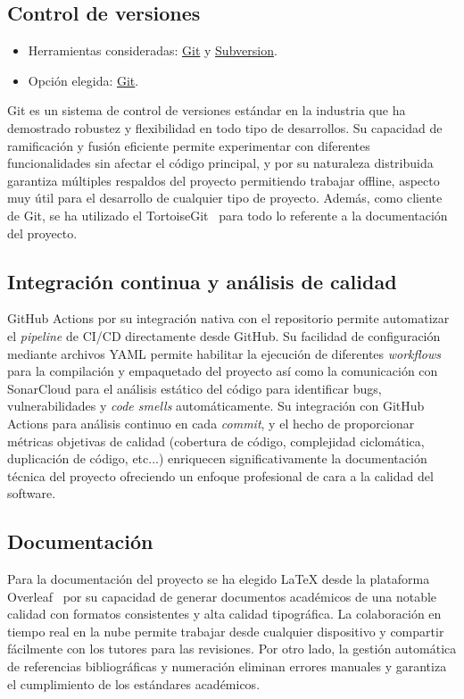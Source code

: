 \subsection{Control de versiones}\label{control-de-versiones}

\begin{itemize}
\tightlist
\item
  Herramientas consideradas: \href{https://git-scm.com/}{Git} y
  \href{https://subversion.apache.org/}{Subversion}.
\item
  Opción elegida: \href{https://git-scm.com/}{Git}.
\end{itemize}

Git es un sistema de control de versiones estándar en la industria que ha demostrado robustez y flexibilidad en todo tipo de desarrollos. Su capacidad de ramificación y fusión eficiente permite experimentar con diferentes funcionalidades sin afectar el código principal, y por su naturaleza distribuida garantiza múltiples respaldos del proyecto permitiendo trabajar offline, aspecto muy útil para el desarrollo de cualquier tipo de proyecto.
Además, como cliente de Git, se ha utilizado el TortoiseGit~\cite{tortoisegit} para todo lo referente a la documentación del proyecto.

\subsection{Integración continua y análisis de calidad}\label{integracion-continua-analisis-calidad}
GitHub Actions por su integración nativa con el repositorio permite automatizar el \emph{pipeline} de CI/CD directamente desde GitHub. Su facilidad de configuración mediante archivos YAML permite habilitar la ejecución de diferentes \emph{workflows} para la compilación y empaquetado del proyecto así como la comunicación con SonarCloud para el análisis estático del código para identificar bugs, vulnerabilidades y \emph{code smells} automáticamente. Su integración con GitHub Actions para análisis continuo en cada \emph{commit}, y el hecho de proporcionar métricas objetivas de calidad (cobertura de código, complejidad ciclomática, duplicación de código, etc...) enriquecen significativamente la documentación técnica del proyecto ofreciendo un enfoque profesional de cara a la calidad del software.

\subsection{Documentación}\label{documentacion}
Para la documentación del proyecto se ha elegido \LaTeX{} desde la plataforma Overleaf~\cite{overleaf} por su capacidad de generar documentos académicos de una notable calidad con formatos consistentes y alta calidad tipográfica. La colaboración en tiempo real en la nube permite trabajar desde cualquier dispositivo y compartir fácilmente con los tutores para las revisiones. Por otro lado, la gestión automática de referencias bibliográficas y numeración eliminan errores manuales y garantiza el cumplimiento de los estándares académicos.

